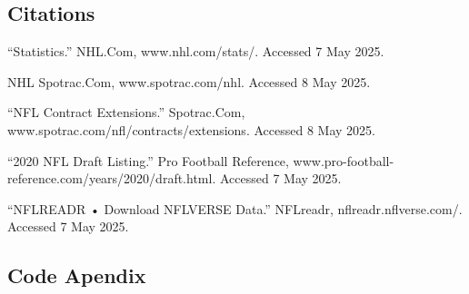 \documentclass[
  letterpaper,
  DIV=11,
  numbers=noendperiod]{scrartcl}
\begin{document}
\subsection{Citations}\label{citations}

``Statistics.'' NHL.Com, www.nhl.com/stats/. Accessed 7 May 2025.

NHL \textbar{} Spotrac.Com, www.spotrac.com/nhl. Accessed 8 May 2025.

``NFL Contract Extensions.'' Spotrac.Com,
www.spotrac.com/nfl/contracts/extensions. Accessed 8 May 2025.

``2020 NFL Draft Listing.'' Pro Football Reference,
www.pro-football-reference.com/years/2020/draft.html. Accessed 7 May
2025.

``NFLREADR • Download NFLVERSE Data.'' NFLreadr, nflreadr.nflverse.com/.
Accessed 7 May 2025.

\subsection{Code Apendix}\label{code-apendix}
\end{document}

